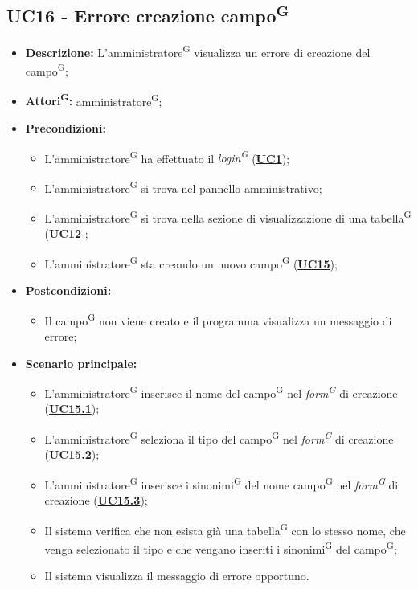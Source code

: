 \subsection{UC16 - Errore creazione campo\textsuperscript{G}}
\label{sec:UC16}
\begin{itemize}
	\item \textbf{Descrizione:} L’amministratore\textsuperscript{G} visualizza un errore di creazione del campo\textsuperscript{G};
	\item \textbf{Attori\textsuperscript{G}:} amministratore\textsuperscript{G};
	\item \textbf{Precondizioni:} 
	\begin{itemize}
		\item L’amministratore\textsuperscript{G} ha effettuato il \textit{login\textsuperscript{G}} (\hyperref[sec:UC1]{\textbf{UC1}});
		\item L’amministratore\textsuperscript{G} si trova nel pannello amministrativo;
		\item L’amministratore\textsuperscript{G} si trova nella sezione di visualizzazione di una tabella\textsuperscript{G} (\hyperref[sec:UC12]{\textbf{UC12}} ;
		\item L’amministratore\textsuperscript{G} sta creando un nuovo campo\textsuperscript{G} (\hyperref[sec:UC15]{\textbf{UC15}});
	\end{itemize}
	\item \textbf{Postcondizioni:} 
	\begin{itemize}
		\item Il campo\textsuperscript{G} non viene creato e il programma visualizza un messaggio di errore;
	\end{itemize}
	\item \textbf{Scenario principale:} 
	\begin{itemize}
		\item L’amministratore\textsuperscript{G} inserisce il nome del campo\textsuperscript{G} nel \textit{form\textsuperscript{G}} di creazione (\hyperref[sec:UC15.1]{\textbf{UC15.1}});
		\item L’amministratore\textsuperscript{G} seleziona il tipo del campo\textsuperscript{G} nel \textit{form\textsuperscript{G}} di creazione (\hyperref[sec:UC15.2]{\textbf{UC15.2}});
		\item L’amministratore\textsuperscript{G} inserisce i sinonimi\textsuperscript{G} del nome campo\textsuperscript{G} nel \textit{form\textsuperscript{G}} di creazione (\hyperref[sec:UC15.3]{\textbf{UC15.3}});
		\item Il sistema verifica che non esista già una tabella\textsuperscript{G} con lo stesso nome, che venga selezionato il tipo e che vengano inseriti i sinonimi\textsuperscript{G} del campo\textsuperscript{G};
		\item Il sistema visualizza il messaggio di errore opportuno.
	\end{itemize}
\end{itemize}

